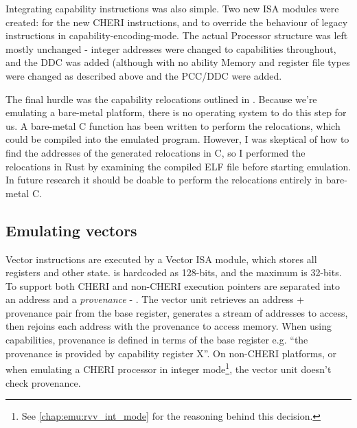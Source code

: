 
Integrating capability instructions was also simple.
Two new ISA modules were created:  for the new CHERI instructions, and  to override the behaviour of legacy instructions in capability-encoding-mode.
The actual Processor structure was left mostly unchanged - integer addresses were changed to capabilities throughout, and the DDC was added (although with no ability 
Memory and register file types were changed as described above and the PCC/DDC were added.

The final hurdle was the capability relocations outlined in .
Because we're emulating a bare-metal platform, there is no operating system to do this step for us.
A bare-metal C function has been written to perform the relocations, which could be compiled into the emulated program.
However, I was skeptical of how to find the addresses of the generated relocations in C, so I performed the relocations in Rust by examining the compiled ELF file before starting emulation.
In future research it should be doable to perform the relocations entirely in bare-metal C.

\subsection{Emulating vectors}

Vector instructions are executed by a Vector ISA module, which stores all registers and other state.
 is hardcoded as 128-bits, and the maximum  is  32-bits.
To support both CHERI and non-CHERI execution pointers are separated into an address and a \emph{provenance} - .
The vector unit retrieves an address + provenance pair from the base register, generates a stream of addresses to access, then rejoins each address with the provenance to access memory.
When using capabilities, provenance is defined in terms of the base register e.g. \enquote{the provenance is provided by capability register X}.
On non-CHERI platforms, or when emulating a CHERI processor in integer mode\footnote{See \cref{chap:emu:rvv_int_mode} for the reasoning behind this decision.}, the vector unit doesn't check provenance.

